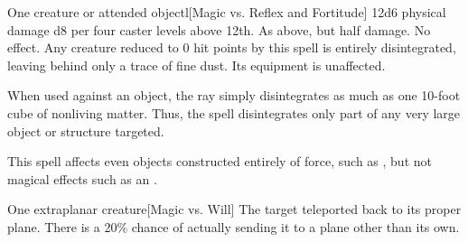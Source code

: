 \begin{spellheader}
    \spellrng{\rngclose}
\end{spellheader}
\begin{spelleffects}
    \begin{spelltarget}{One creature or attended object}l[Magic vs. Reflex and Fortitude]
        \spellsuccess 12d6 physical damage \add d8 per four caster levels above 12th.
        \spellfailure[Fortitude] As above, but half damage.
        \spellfailure[Reflex] No effect.
        \spelleffect Any creature reduced to 0 hit points by this spell is entirely disintegrated, leaving behind only a trace of fine dust. Its equipment is unaffected.
        \par When used against an object, the ray simply disintegrates as much as one 10-foot cube of nonliving matter. Thus, the spell disintegrates only part of any very large object or structure targeted.
    \end{spelltarget}
\end{spelleffects}
\begin{spellfooter}
    \spellnotes This spell affects even objects constructed entirely of force, such as , but not magical effects such as an .
\end{spellfooter}

\begin{spellheader}
    \spellrng{\rngclose}
\end{spellheader}
\begin{spelleffects}
    \begin{spelltarget}{One extraplanar creature}[Magic vs. Will]
        \spellsuccess The target teleported back to its proper plane. There is a 20\% chance of actually sending it to a plane other than its own.
    \end{spelltarget}
\end{spelleffects}

